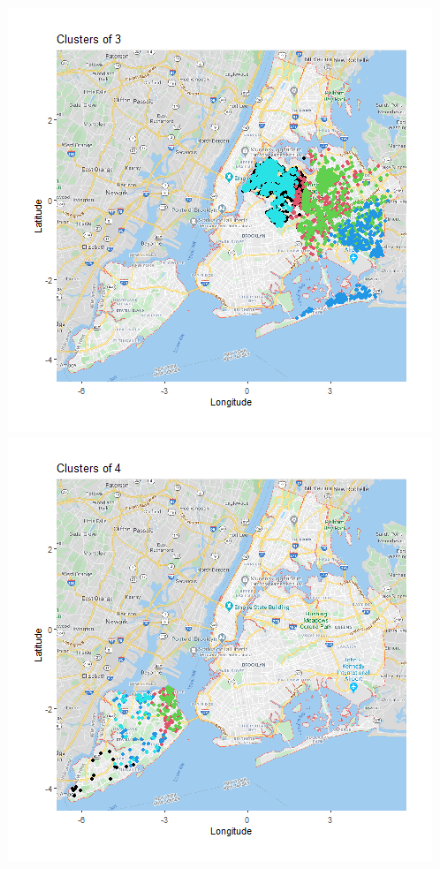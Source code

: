 \documentclass{FR16}
\begin{document}
\begin{figure}[!htb]
\begin{minipage}{0.33\textwidth}
   \end{minipage}
   \begin{minipage}{0.33\textwidth}
     \centering
     \includegraphics[width=1\linewidth]{figures/clust-3.png} 
   \end{minipage}\hfill
   \begin{minipage}{0.33\textwidth}
     \centering
     \includegraphics[width=1\linewidth]{figures/clust-4.png}

\end{minipage}
\end{figure}
\end{document}
